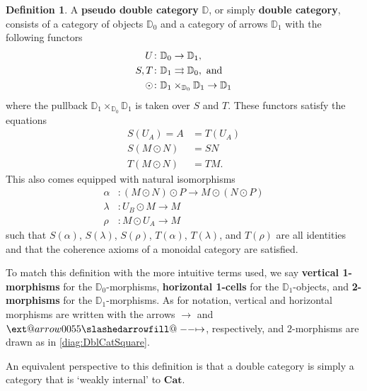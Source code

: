 \documentclass[11pt]{amsart}
\makeatletter
\newcommand{\cat}[1]{\mathbf{#1}}
\newcommand{\dblcat}[1]{\mathbb{#1}}
\renewcommand{\t}[1]{\textup{#1}}
\newcommand{\from}{\colon}
\def\slashedarrowfill@#1#2#3#4#5{%
	$\m@th\thickmuskip0mu\medmuskip\thickmuskip\thinmuskip\thickmuskip
	\relax#5#1\mkern-7mu%
	\cleaders\hbox{$#5\mkern-2mu#2\mkern-2mu$}\hfill
	\mathclap{#3}\mathclap{#2}%
	\cleaders\hbox{$#5\mkern-2mu#2\mkern-2mu$}\hfill
	\mkern-7mu#4$%
}
\def\rightslashedarrowfill@{%
	\slashedarrowfill@\relbar\relbar\mapstochar\rightarrow}
\newcommand{\xslashedrightarrow}[2][]{%
	\ext@arrow 0055{\rightslashedarrowfill@}{#1}{#2}}
\newcommand{\hto}{\xslashedrightarrow{}}
\theoremstyle{remark}
\theoremstyle{definition}
\newtheorem{defn}[thm]{Definition}
\makeatother
\begin{document}
%
\begin{defn}
	\label{def:DoubleCategory}
	A \textbf{pseudo double category} $\dblcat{D}$, or simply \textbf{double category}, consists of a category of objects $\dblcat{D}_{0}$ and a category of arrows $\dblcat{D}_{1}$ with the following functors
	\begin{equation*}
	\begin{split}
	U & \from \dblcat{D}_{0} \to \dblcat{D}_{1}, \\
	S,T & \from \dblcat{D}_{1} \rightrightarrows \dblcat{D}_{0}, \t{ and} \\
	\odot & \from \dblcat{D}_{1} \times_{\dblcat{D}_{0}} \dblcat{D}_{1} \to \dblcat{D}_{1}
	\end{split}
	\end{equation*}
	where the pullback $\dblcat{D}_{1} \times_{\dblcat{D}_{0}} \dblcat{D}_{1}$ is taken over $S$ and $T$.  These functors satisfy the equations
	\begin{equation*}
	\begin{split}
	S(U_{A}) = A &= T(U_{A}) \\
	S(M \odot N) & = SN \\
	T(M \odot N) & = TM. 
	\end{split}
	\end{equation*}
	This also comes equipped with natural isomorphisms
	\begin{equation*}
	\begin{split}
	\alpha & \from (M \odot N) \odot P \to M \odot (N \odot P)\\
	\lambda & \from U_{B} \odot M \to M\\
	\rho & \from M \odot U_{A} \to M
	\end{split}
	\end{equation*}
	such that $S(\alpha)$, $S(\lambda)$, $S(\rho)$, $T(\alpha)$, $T(\lambda)$, and $T(\rho)$ are all identities and that the coherence axioms of a monoidal category are satisfied. 
	
	To match this definition with the more intuitive terms used, we say \textbf{vertical 1-morphisms} for the $\dblcat{D}_{0}$-morphisms, \textbf{horizontal 1-cells} for the $\dblcat{D}_{1}$-objects, and \textbf{2-morphisms} for the $\dblcat{D}_{1}$-morphisms. As for notation, vertical and horizontal morphisms are written with the arrows $\to$ and $\hto$, respectively, and $2$-morphisms are drawn as in \eqref{diag:DblCatSquare}.
\end{defn}

An equivalent perspective to this definition is that a double category is simply a category that is `weakly internal' to $\cat{Cat}$. 
\end{document}
